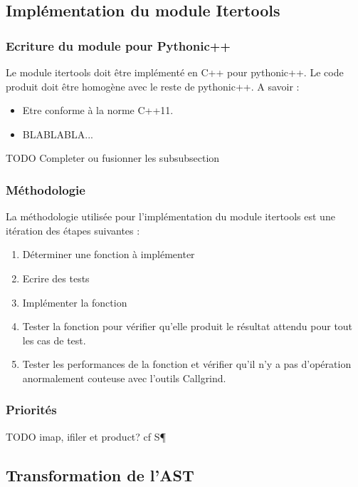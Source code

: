 \documentclass[a4paper]{article}
\begin{document}
\subsection{Implémentation du module Itertools}

\subsubsection{Ecriture du module pour Pythonic++}

Le module itertools doit être implémenté en C++ pour pythonic++. Le code produit doit être homogène avec le reste de pythonic++. A savoir :

\begin{itemize}
\item Etre conforme à la norme C++11.
\item BLABLABLA...
\end{itemize}

TODO Completer ou fusionner les subsubsection

\subsubsection{Méthodologie}

La méthodologie utilisée pour l'implémentation du module itertools est une itération des étapes suivantes :

\begin{enumerate}
\item Déterminer une fonction à implémenter
\item Ecrire des tests 
\item Implémenter la fonction
\item Tester la fonction pour vérifier qu'elle produit le résultat attendu pour tout les cas de test.
\item Tester les performances de la fonction et vérifier qu'il n'y a pas d'opération anormalement couteuse avec l'outils Callgrind. 
\end{enumerate}

\subsubsection{Priorités}

TODO imap, ifiler et product? cf S\P

\subsection{Transformation de l'AST}
\end{document}
